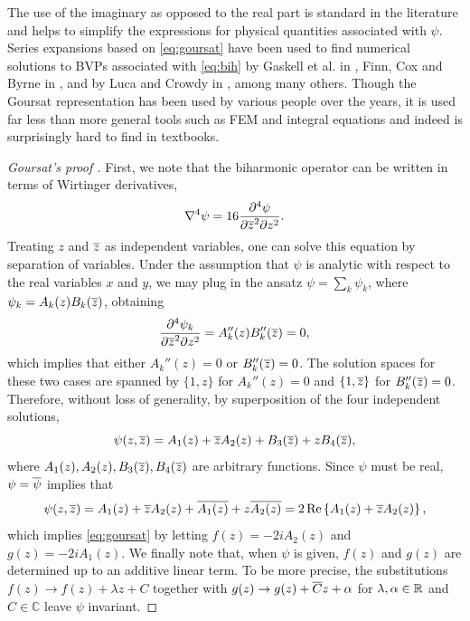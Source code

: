 \documentclass{article}
\begin{document}
The use of the imaginary as opposed to the real part is standard in the
literature and helps to simplify the expressions for physical quantities
associated with $\psi$. Series expansions based on \eqref{eq:goursat} have been
used to find numerical solutions to BVPs associated with \eqref{eq:bih} by
Gaskell et al. in \cite{gaskell98}, Finn, Cox and Byrne in \cite{finn03}, and
by Luca and Crowdy in \cite{luca18}, among many others. Though the Goursat
representation has been used by various people over the years, it is used far
less than more general tools such as FEM and integral equations and indeed is
surprisingly hard to find in textbooks.

\begin{proof}[Goursat's proof \cite{goursat98}]
First, we note that the biharmonic operator can be written in terms of
Wirtinger derivatives,
\begin{equation}
\nabla^4 \psi = 16\frac{\partial^4 \psi}{\partial{\overline{z}}^2 \partial z^2}.
\end{equation}
Treating $z$ and ${\overline{z}}$ as independent variables, one can solve this
equation by separation of variables. Under the assumption that $\psi$ is
analytic with respect to the real variables $x$ and $y$, we may plug in the
ansatz $\psi=\sum_k \psi_k$, where $\psi_k= A_k(z)B_k({\overline{z}})$, obtaining
\begin{equation}
\frac{\partial^4 \psi_k}{\partial{\overline{z}}^2 \partial z^2} 
   = A_k''(z) B_k''({\overline{z}}) = 0,
\end{equation} 
which implies that either $A_k''(z)=0$ or $B_k''({\overline{z}})=0$. The solution
spaces for these two cases are spanned by $\{1,z\}$ for $A_k''(z)=0$  and
$\{1,{\overline{z}}\}$ for $B_k''({\overline{z}})=0$. Therefore, without loss of
generality, by superposition of the four independent solutions,
\begin{equation}
\psi(z,{\overline{z}}) =  A_1(z) + {\overline{z}} A_2(z) + B_3({\overline{z}}) + z B_4({\overline{z}}),
\end{equation}
where $A_1(z), A_2(z), B_3({\overline{z}}), B_4({\overline{z}})$ are arbitrary functions.
Since $\psi$ must be real, $\psi={\overline{\psi}}$ implies that 
\begin{equation}
\psi(z,{\overline{z}}) =  A_1(z)  + {\overline{z}} A_2(z)  + {\overline{A_1(z)}} + z {\overline{A_2(z)}} 
                 = 2 \Re\left\{A_1(z) + {\overline{z}} A_2(z)\right\},
\end{equation}
which implies \eqref{eq:goursat} by letting $f(z) = -2i A_2(z)$
and $g(z) = -2i A_1(z)$. We finally note that, when $\psi$ is given, $f(z)$
and $g(z)$ are determined up to an additive linear term. To be more precise,
the substitutions $f(z)\to f(z)+\lambda z + C$ together with $g(z)\to
g(z)+{\overline{C}}z+\alpha$ for $\lambda,\alpha\in\mathbb{R}$ and $C\in\mathbb{C}$
leave $\psi$ invariant.
\end{proof}
\end{document}
